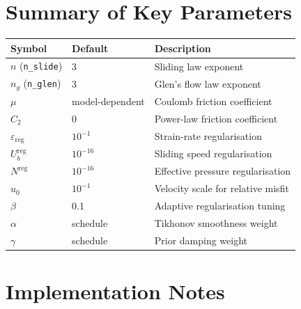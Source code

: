 \documentclass[a4paper,11pt,fleqn]{article}
\newcommand{\eps}{\varepsilon}
\begin{document}
\section{Summary of Key Parameters}
\label{sec:parameters}

\begin{center}
\begin{tabular}{lll}
    \hline
    Symbol & Default & Description \\ \hline
    $n$ (\texttt{n\_slide}) & 3 & Sliding law exponent \\
    $n_g$ (\texttt{n\_glen}) & 3 & Glen's flow law exponent \\
    $\mu$ & model-dependent & Coulomb friction coefficient \\
    $C_2$ & 0 & Power-law friction coefficient \\
    $\eps_{\mathrm{reg}}$ & $10^{-1}$ & Strain-rate regularisation \\
    $U_b^{\mathrm{reg}}$ & $10^{-16}$ & Sliding speed regularisation \\
    $N^{\mathrm{reg}}$ & $10^{-16}$ & Effective pressure regularisation \\
    $u_0$ & $10^{-1}$ & Velocity scale for relative misfit \\
    $\beta$ & 0.1 & Adaptive regularisation tuning \\
    $\alpha$ & schedule & Tikhonov smoothness weight \\
    $\gamma$ & schedule & Prior damping weight \\
    \hline
\end{tabular}
\end{center}

\section{Implementation Notes}
\end{document}
